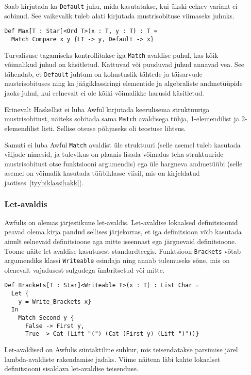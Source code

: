 \documentclass[12pt]{article}
\begin{document}
        Saab kirjutada ka \verb!Default! juhu, mida kasutatakse, kui ükski eelnev variant ei sobinud. See vaikevalik tuleb alati kirjutada mustrisobituse viimaseks juhuks.

        \begin{verbatim}Def Max[T : Star]<Ord T>(x : T, y : T) : T =
  Match Compare x y {LT -> y, Default -> x}\end{verbatim}

        Turvalisuse tagamiseks kontrollitakse iga \verb!Match! avaldise puhul, kas kõik võimalikud juhud on käsitletud. Kattuvad või puuduvad juhud annavad vea. See tähendab, et \verb!Default! juhtum on kohustuslik tähtede ja täisarvude mustrisobituses ning ka jäägiklassiringi elementide ja algebraliste andmetüüpide jaoks juhul, kui eelnevalt ei ole kõiki võimalikke harusid käsitletud.

        Erinevalt Haskellist ei luba Awful kirjutada keerulisema struktuuriga mustrisobitust, näiteks sobitada sama \verb!Match! avaldisega tühja, 1-elemendilist ja 2-elemendilist listi. Sellise otsuse põhjuseks oli teostuse lihtsus.

        Samuti ei luba Awful \verb!Match! avaldist üle struktuuri (selle asemel tuleb kasutada väljade nimesid, ja tulevikus on plaanis lisada võimalus teha struktuuride mustrisobitust otse funktsiooni argumendis) ega üle hargneva andmetüübi (selle asemel on võimalik kasutada tüübiklasse viisil, mis on kirjeldatud jaotises~\ref{tyybiklassihakk}).
      \subsubsection{Let-avaldis}\label{letavaldis}
        Awfulis on olemas järjestikune let-avaldis. Let-avaldise lokaalsed definitsioonid peavad olema kirja pandud sellises järjekorras, et iga definitsioon võib kasutada ainult eelnevaid definitsioone aga mitte iseennast ega järgnevaid definitsioone. Toome näite let-avaldise kasutusest standardteegis. Funktsioon \verb!Brackets! võtab argumendiks klassi \verb!Writeable! esindaja ning annab tulemuseks sõne, mis on olenevalt vajadusest sulgudega ümbritsetud või mitte.

        \begin{verbatim}Def Brackets[T : Star]<Writeable T>(x : T) : List Char =
  Let {
    y = Write_Brackets x}
  In
    Match Second y {
      False -> First y,
      True -> Cat (Lift "(") (Cat (First y) (Lift ")"))}\end{verbatim}

        Let-avaldised on Awfulis süntaktiline suhkur, mis teisendatakse parsimise järel lambda-avaldiste rakendamise jadaks. Viime näitena läbi kahte lokaalset definitsiooni sisaldava let-avaldise teisenduse.
\end{document}
